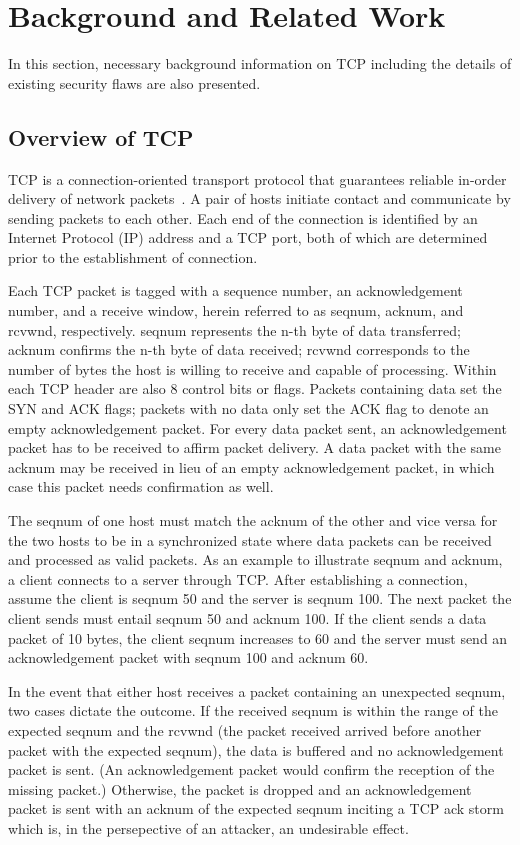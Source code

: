 \documentclass{sig-alternate}
\begin{document}
\section{Background and Related Work}

In this section, necessary background information on TCP including the details of existing security flaws are also presented.

\subsection{Overview of TCP}

TCP is a connection-oriented transport protocol that guarantees reliable in-order delivery of network packets~\cite{rfc:tcp}.
A pair of hosts initiate contact and communicate by sending packets to each other.
Each end of the connection is identified by an Internet Protocol (IP) address and a TCP port, both of which are determined prior to the establishment of connection.

Each TCP packet is tagged with a sequence number, an acknowledgement number, and a receive window, herein referred to as seqnum, acknum, and rcvwnd, respectively.
seqnum represents the n-th byte of data transferred; acknum confirms the n-th byte of data received; rcvwnd corresponds to the number of bytes the host is willing to receive and capable of processing.
Within each TCP header are also 8 control bits or flags.
Packets containing data set the SYN and ACK flags; packets with no data only set the ACK flag to denote an empty acknowledgement packet.
For every data packet sent, an acknowledgement packet has to be received to affirm packet delivery.
A data packet with the same acknum may be received in lieu of an empty acknowledgement packet, in which case this packet needs confirmation as well.

The seqnum of one host must match the acknum of the other and vice versa for the two hosts to be in a synchronized state where data packets can be received and processed as valid packets.
As an example to illustrate seqnum and acknum, a client connects to a server through TCP.
After establishing a connection, assume the client is seqnum 50 and the server is seqnum 100.
The next packet the client sends must entail seqnum 50 and acknum 100.
If the client sends a data packet of 10 bytes, the client seqnum increases to 60 and the server must send an acknowledgement packet with seqnum 100 and acknum 60.

In the event that either host receives a packet containing an unexpected seqnum, two cases dictate the outcome.
If the received seqnum is within the range of the expected seqnum and the rcvwnd (the packet received arrived before another packet with the expected seqnum), the data is buffered and no acknowledgement packet is sent.
(An acknowledgement packet would confirm the reception of the missing packet.) Otherwise, the packet is dropped and an acknowledgement packet is sent with an acknum of the expected seqnum inciting a TCP ack storm~\cite{anderson:ackstorm} which is, in the persepective of an attacker, an undesirable effect.
\end{document}

